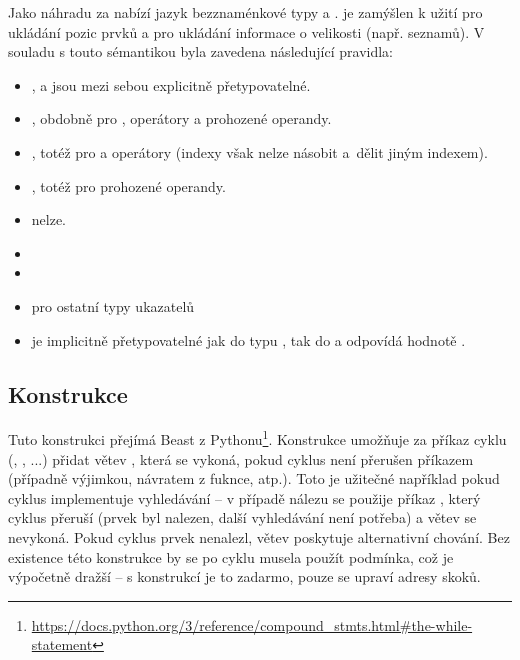 Jako náhradu za  nabízí jazyk bezznaménkové typy  a .  je zamýšlen k užití pro ukládání pozic prvků a  pro ukládání informace o velikosti (např. seznamů). V souladu s touto sémantikou byla zavedena následující pravidla:
\begin{itemize}
	\item {},  a  jsou mezi sebou explicitně přetypovatelné.
	\item {}, obdobně pro , operátory \inlineCode{\- * /} a prohozené operandy.
	\item {}, totéž pro  a operátory \inlineCode{\- * /} (indexy však nelze násobit a~dělit jiným indexem).
	\item {}, totéž pro prohozené operandy.
	\item {} nelze.
	\item {}
	\item {}
	\item {} pro ostatní typy ukazatelů
	\item {} je implicitně přetypovatelné jak do typu , tak do  a odpovídá hodnotě .
\end{itemize}

\subsection{Konstrukce } \label{design:whileElse}
Tuto konstrukci přejímá Beast z Pythonu\footnote{\url{https://docs.python.org/3/reference/compound_stmts.html\#the-while-statement}}. Konstrukce umožňuje za příkaz cyklu (, , ...) přidat větev , která se vykoná, pokud cyklus není přerušen příkazem  (případně výjimkou, návratem z fuknce, atp.). Toto je užitečné například pokud cyklus implementuje vyhledávání -- v případě nálezu se použije příkaz , který cyklus přeruší (prvek byl nalezen, další vyhledávání není potřeba) a větev  se nevykoná. Pokud cyklus prvek nenalezl, větev  poskytuje alternativní chování. Bez existence této konstrukce by se po cyklu musela použít podmínka, což je výpočetně dražší -- s konstrukcí  je to zadarmo, pouze se upraví adresy skoků.


